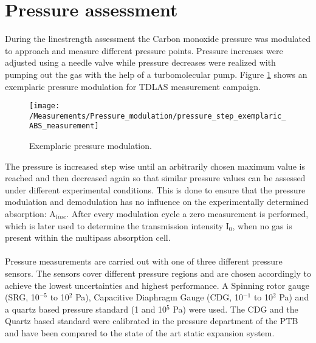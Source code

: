 \section{Pressure assessment}
\label{sec:Pressure_assessment}
During the linestrength assessment the Carbon monoxide pressure was modulated to approach and measure different pressure points. Pressure increases were adjusted using a needle valve while pressure decreases were realized with pumping out the gas with the help of a turbomolecular pump. Figure \ref{fig:pressure_modulation} shows an exemplaric pressure modulation for TDLAS measurement campaign.
\begin{figure}[H]
	\centering
	\texttt{[image: /Measurements/Pressure\_modulation/pressure\_step\_exemplaric\_ABS\_measurement]}
	\caption{Exemplaric pressure modulation.}
	\label{fig:pressure_modulation}
\end{figure}
\noindent
The pressure is increased step wise until an arbitrarily chosen maximum value is reached and then decreased again so that similar pressure values can be assessed under different experimental conditions. This is done to ensure that the pressure modulation and demodulation has no influence on the experimentally determined absorption: A$_{line}$. After every modulation cycle a zero measurement is performed, which is later used to determine the transmission intensity I$_0$, when no gas is present within the multipass absorption cell.\\\\
\noindent
Pressure measurements are carried out with one of three different pressure sensors. The sensors cover different pressure regions and are chosen accordingly to achieve the lowest uncertainties and highest performance. A Spinning rotor gauge (SRG, 10$^{-5}$ to 10$^2$ Pa), Capacitive Diaphragm Gauge (CDG, 10$^{-1}$ to 10$^2$ Pa) and a quartz based pressure standard (1 and 10$^5$ Pa) were used. The CDG and the Quartz based standard were calibrated in the pressure department of the PTB and have been compared to the state of the art static expansion system.

